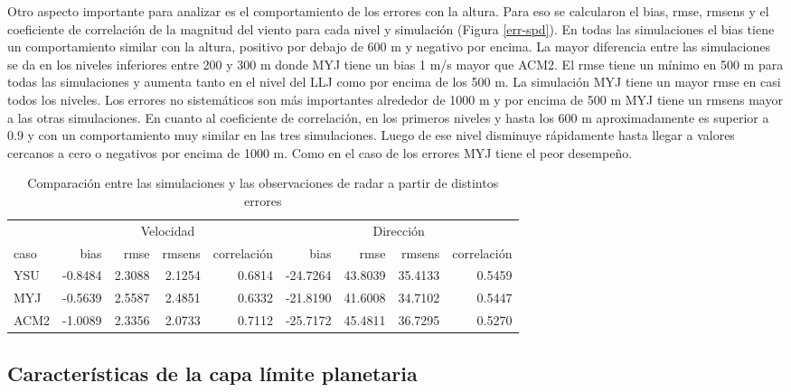 \documentclass[12pt,spanish,oneside]{book}
\begin{document}
Otro aspecto importante para analizar es el comportamiento de los
errores con la altura. Para eso se calcularon el bias, rmse, rmsens y el
coeficiente de correlación de la magnitud del viento para cada nivel y
simulación (Figura \ref{err-spd}). En todas las simulaciones el bias
tiene un comportamiento similar con la altura, positivo por debajo de
600 m y negativo por encima. La mayor diferencia entre las simulaciones
se da en los niveles inferiores entre 200 y 300 m donde MYJ tiene un
bias 1 m/s mayor que ACM2. El rmse tiene un mínimo en 500 m para todas
las simulaciones y aumenta tanto en el nivel del LLJ como por encima de
los 500 m. La simulación MYJ tiene un mayor rmse en casi todos los
niveles. Los errores no sistemáticos son más importantes alrededor de
1000 m y por encima de 500 m MYJ tiene un rmsens mayor a las otras
simulaciones. En cuanto al coeficiente de correlación, en los primeros
niveles y hasta los 600 m aproximadamente es superior a 0.9 y con un
comportamiento muy similar en las tres simulaciones. Luego de ese nivel
disminuye rápidamente hasta llegar a valores cercanos a cero o negativos
por encima de 1000 m. Como en el caso de los errores MYJ tiene el peor
desempeño.

\begin{table}[!h]

\caption{\label{tab:err-tabla}Comparación entre las simulaciones y las observaciones de radar a partir de distintos errores \label{err}}
\centering
\begin{tabular}[t]{lrrrrrrrr}
\toprule
\multicolumn{1}{c}{ } & \multicolumn{4}{c}{Velocidad} & \multicolumn{4}{c}{Dirección} \\
\cmidrule(l{2pt}r{2pt}){2-5} \cmidrule(l{2pt}r{2pt}){6-9}
caso & bias & rmse & rmsens & correlación & bias & rmse & rmsens & correlación\\
\midrule
YSU & -0.8484 & 2.3088 & 2.1254 & 0.6814 & -24.7264 & 43.8039 & 35.4133 & 0.5459\\
MYJ & -0.5639 & 2.5587 & 2.4851 & 0.6332 & -21.8190 & 41.6008 & 34.7102 & 0.5447\\
ACM2 & -1.0089 & 2.3356 & 2.0733 & 0.7112 & -25.7172 & 45.4811 & 36.7295 & 0.5270\\
\bottomrule
\end{tabular}
\end{table}

\subsection{Características de la capa límite
planetaria}\label{caracteristicas-de-la-capa-limite-planetaria-1}
\end{document}
